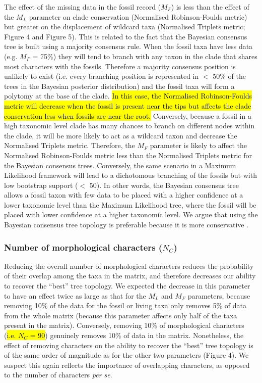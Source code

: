 \documentclass[12pt,letterpaper]{article}
\begin{document}
The effect of the missing data in the fossil record ($M_{F}$) is less than the effect of the $M_{L}$ parameter on clade conservation (Normalised Robinson-Foulds metric) but greater on the displacement of wildcard taxa (Normalised Triplets metric; Figure 4 and Figure 5).
This is related to the fact that the Bayesian consensus tree is built using a majority consensus rule.
When the fossil taxa have less data (e.g. $M_{F}$ = 75\%) they will tend to branch with any taxon in the clade that shares most characters with the fossils.
Therefore a majority consensus position is unlikely to exist (i.e. every branching position is represented in $<$ 50\% of the trees in the Bayesian posterior distribution) and the fossil taxa will form a polytomy at the base of the clade.
\hl{In this case, the Normalised Robinson-Foulds metric will decrease when the fossil is present near the tips but affects the clade conservation less when fossils are near the root.}
Conversely, because a fossil in a high taxonomic level clade has many chances to branch on different nodes within the clade, it will be more likely to act as a wildcard taxon and decrease the Normalised Triplets metric.
Therefore, the $M_{F}$ parameter is likely to affect the Normalised Robinson-Foulds metric less than the Normalised Triplets metric for the Bayesian consensus trees.
Conversely, the same scenario in a Maximum Likelihood framework will lead to a dichotomous branching of the fossils but with low bootstrap support ($<$ 50).
In other words, the Bayesian consensus tree allows a fossil taxon with few data to be placed with a higher confidence at a lower taxonomic level than the Maximum Likelihood tree, where the fossil will be placed with lower confidence at a higher taxonomic level.
We argue that using the Bayesian consensus tree topology is preferable because it is more conservative \citep[e.g.][]{pattinsonphylogeny2014}.

\subsubsection{Number of morphological characters ($N_{C}$)}
Reducing the overall number of morphological characters reduces the probability of their overlap among the taxa in the matrix, and therefore decreases our ability to recover the ``best'' tree topology.
We expected the decrease in this parameter to have an effect twice as large as that for the $M_{L}$ and $M_{F}$ parameters, because removing 10\% of the data for the fossil or living taxa only removes 5\% of data from the whole matrix (because this parameter affects only half of the taxa present in the matrix).
Conversely, removing 10\% of morphological characters (\hl{i.e. $N_{C}$ = 90}) genuinely removes 10\% of data in the matrix.
Nonetheless, the effect of removing characters on the ability to recover the ``best'' tree topology is of the same order of magnitude as for the other two parameters (Figure 4).
We suspect this again reflects the importance of overlapping characters, as opposed to the number of characters \textit{per se}.
\end{document}
